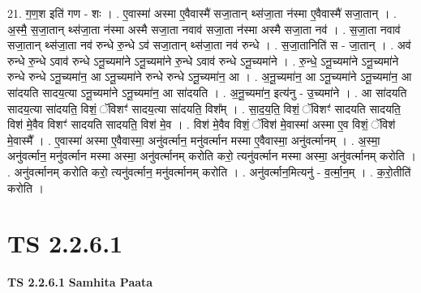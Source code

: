 \documentclass[17pt]{extarticle}
\begin{document}
21. ग॒ण॒श इति॑ गण - शः । . ए॒वास्मा॑ अस्मा ए॒वैवास्मै॑ सजा॒तान् थ्स॑जा॒ता न॑स्मा ए॒वैवास्मै॑ सजा॒तान् । . अ॒स्मै॒ स॒जा॒तान् थ्स॑जा॒ता न॑स्मा अस्मै सजा॒ता नवाव॑ सजा॒ता न॑स्मा अस्मै सजा॒ता नव॑ । . स॒जा॒ता नवाव॑ सजा॒तान् थ्स॑जा॒ता नव॑ रुन्धे रु॒न्धे ऽव॑ सजा॒तान् थ्स॑जा॒ता नव॑ रुन्धे । . स॒जा॒तानिति॑ स - जा॒तान् । . अव॑ रुन्धे रु॒न्धे ऽवाव॑ रुन्धे ऽनू॒च्यमा॑ने ऽनू॒च्यमा॑ने रु॒न्धे ऽवाव॑ रुन्धे ऽनू॒च्यमा॑ने । . रु॒न्धे॒ ऽनू॒च्यमा॑ने ऽनू॒च्यमा॑ने रुन्धे रुन्धे ऽनू॒च्यमा॑न॒ आ ऽनू॒च्यमा॑ने रुन्धे रुन्धे ऽनू॒च्यमा॑न॒ आ । . अ॒नू॒च्यमा॑न॒ आ ऽनू॒च्यमा॑ने ऽनू॒च्यमा॑न॒ आ सा॑दयति सादय॒त्या ऽनू॒च्यमा॑ने ऽनू॒च्यमा॑न॒ आ सा॑दयति । . अ॒नू॒च्यमा॑न॒ इत्य॑नु - उ॒च्यमा॑ने । . आ सा॑दयति सादय॒त्या सा॑दयति॒ विशं॒ ॅविशꣳ॑ सादय॒त्या सा॑दयति॒ विश᳚म् । . सा॒द॒य॒ति॒ विशं॒ ॅविशꣳ॑ सादयति सादयति॒ विश॑ मे॒वैव विशꣳ॑ सादयति सादयति॒ विश॑ मे॒व । . विश॑ मे॒वैव विशं॒ ॅविश॑ मे॒वास्मा॑ अस्मा ए॒व विशं॒ ॅविश॑ मे॒वास्मै᳚ । . ए॒वास्मा॑ अस्मा ए॒वैवास्मा॒ अनु॑वर्त्मान॒ मनु॑वर्त्मान मस्मा ए॒वैवास्मा॒ अनु॑वर्त्मानम् । . अ॒स्मा॒ अनु॑वर्त्मान॒ मनु॑वर्त्मान मस्मा अस्मा॒ अनु॑वर्त्मानम् करोति करो॒ त्यनु॑वर्त्मान मस्मा अस्मा॒ अनु॑वर्त्मानम् करोति । . अनु॑वर्त्मानम् करोति करो॒ त्यनु॑वर्त्मान॒ मनु॑वर्त्मानम् करोति । . अनु॑वर्त्मान॒मित्यनु॑ - व॒र्त्मा॒न॒म् । . क॒रो॒तीति॑ करोति । \newline
\pagebreak
{}
\section*{ TS 2.2.6.1 }

\textbf{TS 2.2.6.1 } \newline
\textbf{Samhita Paata} \newline
\end{document}
